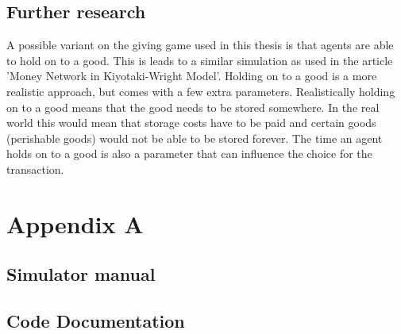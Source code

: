 \documentclass[twoside,openright]{uva-bachelor-thesis}
\begin{document}
\section{Further research}



A possible variant on the giving game used in this thesis is that agents are able to hold on to a good. This is leads to a similar simulation as used in the article 'Money Network in Kiyotaki-Wright Model'. Holding on to a good is a more realistic approach, but comes with a few extra parameters. Realistically holding on to a good means that the good needs to be stored somewhere. In the real world this would mean that storage costs have to be paid and certain goods (perishable goods) would not be able to be stored forever. The time an agent holds on to a good is also a parameter that can influence the choice for the transaction.

\chapter{Appendix A}

\section{Simulator manual}

\section{Code Documentation}
\end{document}
